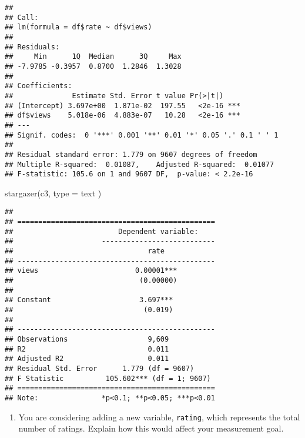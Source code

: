 \documentclass[
]{article}
\newenvironment{Shaded}{\begin{snugshade}}{\end{snugshade}}
\newcommand{\AttributeTok}[1]{\textcolor[rgb]{0.77,0.63,0.00}{#1}}
\newcommand{\FunctionTok}[1]{\textcolor[rgb]{0.00,0.00,0.00}{#1}}
\newcommand{\NormalTok}[1]{#1}
\newcommand{\StringTok}[1]{\textcolor[rgb]{0.31,0.60,0.02}{#1}}
\providecommand{\tightlist}{%
  \setlength{\itemsep}{0pt}\setlength{\parskip}{0pt}}
\begin{document}
\begin{verbatim}
## 
## Call:
## lm(formula = df$rate ~ df$views)
## 
## Residuals:
##     Min      1Q  Median      3Q     Max 
## -7.9785 -0.3957  0.8700  1.2846  1.3028 
## 
## Coefficients:
##              Estimate Std. Error t value Pr(>|t|)    
## (Intercept) 3.697e+00  1.871e-02  197.55   <2e-16 ***
## df$views    5.018e-06  4.883e-07   10.28   <2e-16 ***
## ---
## Signif. codes:  0 '***' 0.001 '**' 0.01 '*' 0.05 '.' 0.1 ' ' 1
## 
## Residual standard error: 1.779 on 9607 degrees of freedom
## Multiple R-squared:  0.01087,    Adjusted R-squared:  0.01077 
## F-statistic: 105.6 on 1 and 9607 DF,  p-value: < 2.2e-16
\end{verbatim}

\begin{Shaded}
\begin{Highlighting}[]
\FunctionTok{stargazer}\NormalTok{(c3, }\AttributeTok{type =} \StringTok{\textquotesingle{}text\textquotesingle{}}\NormalTok{ )}
\end{Highlighting}
\end{Shaded}

\begin{verbatim}
## 
## ===============================================
##                         Dependent variable:    
##                     ---------------------------
##                                rate            
## -----------------------------------------------
## views                       0.00001***         
##                              (0.00000)         
##                                                
## Constant                     3.697***          
##                               (0.019)          
##                                                
## -----------------------------------------------
## Observations                   9,609           
## R2                             0.011           
## Adjusted R2                    0.011           
## Residual Std. Error      1.779 (df = 9607)     
## F Statistic          105.602*** (df = 1; 9607) 
## ===============================================
## Note:               *p<0.1; **p<0.05; ***p<0.01
\end{verbatim}

\begin{enumerate}
\def\labelenumi{\alph{enumi}.}
\setcounter{enumi}{2}
\tightlist
\item
  You are considering adding a new variable, \texttt{rating}, which
  represents the total number of ratings. Explain how this would affect
  your measurement goal.
\end{enumerate}
\end{document}
